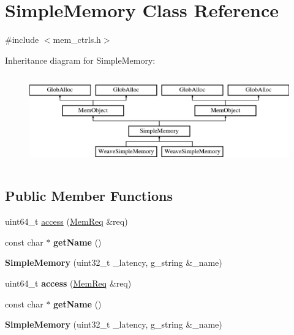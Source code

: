 \hypertarget{classSimpleMemory}{\section{Simple\-Memory Class Reference}
\label{classSimpleMemory}
}


{\ttfamily \#include $<$mem\-\_\-ctrls.\-h$>$}

Inheritance diagram for Simple\-Memory\-:\begin{figure}[H]
\begin{center}
\leavevmode
\includegraphics[height=3.943662cm]{classSimpleMemory}
\end{center}
\end{figure}
\subsection*{Public Member Functions}
\begin{DoxyCompactItemize}
\item 
uint64\-\_\-t \hyperlink{classSimpleMemory_ac039949875dbb0c771e6e329fa76a2ed}{access} (\hyperlink{structMemReq}{Mem\-Req} \&req)
\item 
\hypertarget{classSimpleMemory_a44ecdfffe9ce4f531ae109446fcc8096}{const char $\ast$ {\bfseries get\-Name} ()}\label{classSimpleMemory_a44ecdfffe9ce4f531ae109446fcc8096}

\item 
\hypertarget{classSimpleMemory_a5903cbe57be99225d0da6ca70157541e}{{\bfseries Simple\-Memory} (uint32\-\_\-t \-\_\-latency, g\-\_\-string \&\-\_\-name)}\label{classSimpleMemory_a5903cbe57be99225d0da6ca70157541e}

\item 
\hypertarget{classSimpleMemory_ac039949875dbb0c771e6e329fa76a2ed}{uint64\-\_\-t {\bfseries access} (\hyperlink{structMemReq}{Mem\-Req} \&req)}\label{classSimpleMemory_ac039949875dbb0c771e6e329fa76a2ed}

\item 
\hypertarget{classSimpleMemory_a44ecdfffe9ce4f531ae109446fcc8096}{const char $\ast$ {\bfseries get\-Name} ()}\label{classSimpleMemory_a44ecdfffe9ce4f531ae109446fcc8096}

\item 
\hypertarget{classSimpleMemory_a5903cbe57be99225d0da6ca70157541e}{{\bfseries Simple\-Memory} (uint32\-\_\-t \-\_\-latency, g\-\_\-string \&\-\_\-name)}\label{classSimpleMemory_a5903cbe57be99225d0da6ca70157541e}

\end{DoxyCompactItemize}



